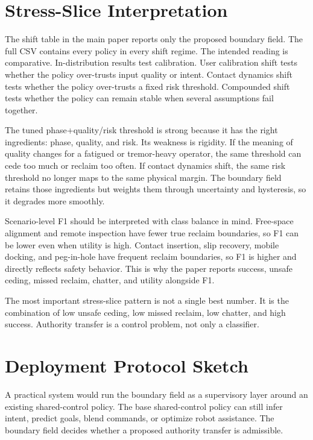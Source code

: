 \documentclass{article}
\begin{document}
\clearpage
\section{Stress-Slice Interpretation}

The shift table in the main paper reports only the proposed boundary field. The full CSV contains every policy in every shift regime. The intended reading is comparative. In-distribution results test calibration. User calibration shift tests whether the policy over-trusts input quality or intent. Contact dynamics shift tests whether the policy over-trusts a fixed risk threshold. Compounded shift tests whether the policy can remain stable when several assumptions fail together.

The tuned phase+quality/risk threshold is strong because it has the right ingredients: phase, quality, and risk. Its weakness is rigidity. If the meaning of quality changes for a fatigued or tremor-heavy operator, the same threshold can cede too much or reclaim too often. If contact dynamics shift, the same risk threshold no longer maps to the same physical margin. The boundary field retains those ingredients but weights them through uncertainty and hysteresis, so it degrades more smoothly.

Scenario-level F1 should be interpreted with class balance in mind. Free-space alignment and remote inspection have fewer true reclaim boundaries, so F1 can be lower even when utility is high. Contact insertion, slip recovery, mobile docking, and peg-in-hole have frequent reclaim boundaries, so F1 is higher and directly reflects safety behavior. This is why the paper reports success, unsafe ceding, missed reclaim, chatter, and utility alongside F1.

The most important stress-slice pattern is not a single best number. It is the combination of low unsafe ceding, low missed reclaim, low chatter, and high success. Authority transfer is a control problem, not only a classifier.

\clearpage
\section{Deployment Protocol Sketch}

A practical system would run the boundary field as a supervisory layer around an existing shared-control policy. The base shared-control policy can still infer intent, predict goals, blend commands, or optimize robot assistance. The boundary field decides whether a proposed authority transfer is admissible.
\end{document}
